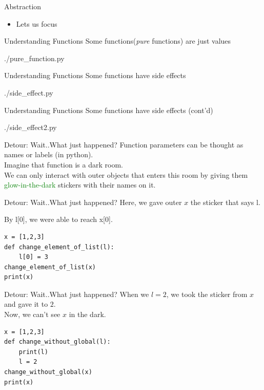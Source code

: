 \documentclass{beamer}
\begin{document}
\begin{frame}{Abstraction}
  \begin{itemize}
    \item Lets us focus
  \end{itemize}
\end{frame}

\begin{frame}{Understanding Functions}
  Some functions(\textit{pure} functions) are just values
  \begin{lstinputlisting}
    {./pure_function.py}
  \end{lstinputlisting}
\end{frame}

\begin{frame}{Understanding Functions}
  Some functions have side effects
  \begin{lstinputlisting}
    {./side_effect.py}
  \end{lstinputlisting}
\end{frame}

\begin{frame}{Understanding Functions}
  Some functions have side effects (cont'd)
  \begin{lstinputlisting}
    {./side_effect2.py}
  \end{lstinputlisting}
\end{frame}

\begin{frame}{Detour: Wait..What just happened?}
  Function parameters can be thought as names or labels (in python).\\

  Imagine that function is a dark room.\\
  We can only interact with outer objects that enters this room by 
  giving them \textcolor{green}{glow-in-the-dark} stickers with their names on it.
\end{frame}

\begin{frame}[fragile]{Detour: Wait..What just happened?}
  Here, we gave outer $x$ the sticker that says l.

  By l[0], we were able to reach x[0].
  \begin{lstlisting}
x = [1,2,3]
def change_element_of_list(l):
    l[0] = 3
change_element_of_list(x)
print(x)
  \end{lstlisting}
\end{frame}

\begin{frame}[fragile]{Detour: Wait..What just happened?}
  When we $l = 2$, we took the sticker from $x$ and gave it to $2$.\\
  Now, we can't see $x$ in the dark.

  \begin{lstlisting}
x = [1,2,3]
def change_without_global(l):
    print(l)
    l = 2
change_without_global(x)
print(x)
  \end{lstlisting}
\end{frame}
\end{document}
